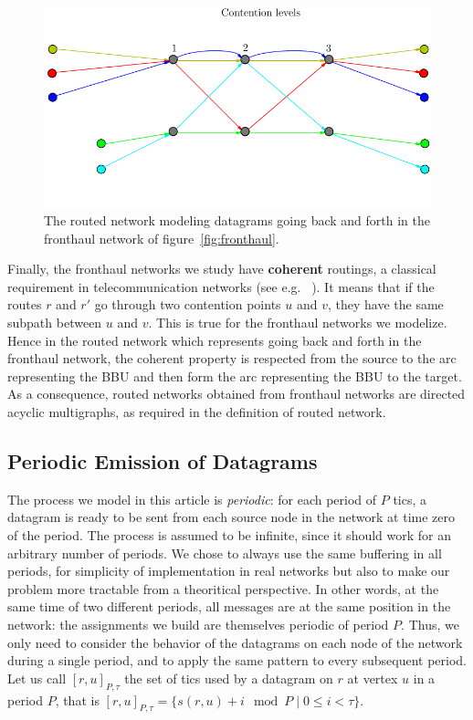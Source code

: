 \documentclass[english]{article}
\begin{document}
    \begin{figure}

	\centering
	\includegraphics[scale=0.8]{allerretour}


\caption{The routed network modeling datagrams going back and forth in the fronthaul network of figure~\ref{fig:fronthaul}.}
\label{fig:allerretour}
\end{figure}

Finally, the fronthaul networks we study have \textbf{coherent} routings, a classical 
requirement in telecommunication networks (see e.g. ~\cite{schwiebert1996necessary}). It means that
if the routes $r$ and $r'$ go through two contention points $u$ and $v$, they have the same subpath
between $u$ and $v$.
This is true for the fronthaul networks we modelize. Hence in the routed network which represents 
going back and forth in the fronthaul network, the coherent property is respected from the source 
to the arc representing the BBU and then form the arc representing the BBU to the target.
 As a consequence, routed networks obtained from fronthaul networks are directed acyclic multigraphs, as required in the definition of routed network.
     
  \subsection{Periodic Emission of Datagrams}

 	The process we model in this article is \emph{periodic}: for each period of $P$ tics, a datagram is ready to be sent from each source node in the network at time zero of the period. The process is assumed to be infinite, since it should work for an arbitrary number of periods. We chose to always use the same buffering in all periods, for simplicity of implementation in real networks but also to make our problem more tractable from a theoritical perspective. In other words, at the same time of two different periods, all messages are at the same position in the network: the assignments we build are themselves periodic of period $P$. Thus, we only need to consider the behavior of the datagrams on each node of the network during a single period, and to apply the same pattern to every subsequent period. 
    Let us call $[r,u]_{P,\tau}$ the set of tics used by a datagram on $r$ at vertex $u$ in a period $P$, that is $[r,u]_{P,\tau} = \{s(r,u) + i \mod P \mid 0 \leq i < \tau \}$. 
\end{document}

